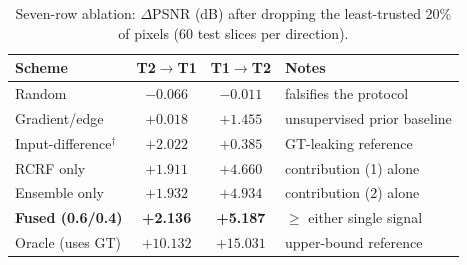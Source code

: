 \begin{table}[htbp]
\centering\small
\caption{Seven-row ablation: $\Delta$PSNR (dB) after dropping the
least-trusted 20\% of pixels (60 test slices per direction).}
\label{tab:ablation_en}
\begin{tabular}{lcc l}
\toprule
Scheme & T2$\to$T1 & T1$\to$T2 & Notes \\
\midrule
Random & $-0.066$ & $-0.011$ & falsifies the protocol \\
Gradient/edge & $+0.018$ & $+1.455$ & unsupervised prior baseline \\
Input-difference$^{\dagger}$ & $+2.022$ & $+0.385$ & GT-leaking reference \\
RCRF only & $+1.911$ & $+4.660$ & contribution (1) alone \\
Ensemble only & $+1.932$ & $+4.934$ & contribution (2) alone \\
\textbf{Fused (0.6/0.4)} & \textbf{+2.136} & \textbf{+5.187} & $\ge$ either single signal \\
Oracle (uses GT) & $+10.132$ & $+15.031$ & upper-bound reference \\
\bottomrule
\end{tabular}
\end{table}
